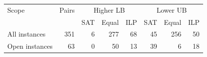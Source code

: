 \begin{tabular}{lrrrrrrr}
\toprule
Scope & Pairs & \multicolumn{3}{c}{Higher LB} & \multicolumn{3}{c}{Lower UB} \\
& & SAT & Equal & ILP & SAT & Equal & ILP \\
\midrule
All instances & 351 & 6 & 277 & 68 & 45 & 256 & 50 \\
Open instances & 63 & 0 & 50 & 13 & 39 & 6 & 18 \\
\bottomrule
\end{tabular}
